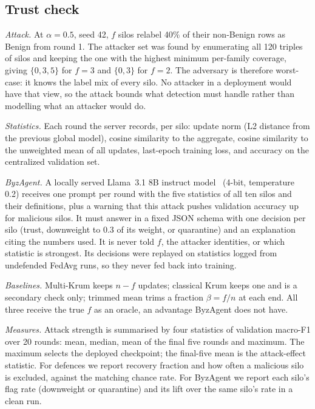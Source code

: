 \documentclass[conference]{IEEEtran}
\begin{document}
\subsection{Trust check}
\label{sec:m-trust}
\emph{Attack.} At $\alpha=0.5$, seed 42, $f$ silos relabel 40\% of their non-Benign rows %
as Benign from round 1. The attacker set was found by enumerating all 120 triples %
of silos and keeping the one with the highest minimum per-family coverage, giving
$\{0,3,5\}$ for $f=3$ and $\{0,3\}$ for $f=2$. The adversary is therefore worst-case: it %
knows the label mix of every silo. No attacker in a deployment would have that view, so
the attack bounds what detection must handle rather than modelling what an attacker
would do.

\emph{Statistics.} Each round the server records, per silo: update norm (L2 distance
from the previous global model), cosine similarity to the aggregate, cosine similarity
to the unweighted mean of all updates, last-epoch training loss, and accuracy on the
centralized validation set.

\emph{ByzAgent.} A locally served Llama~3.1 8B instruct model~\cite{grattafiori2024llama3}
(4-bit, temperature 0.2) receives one prompt per round with the five statistics of all %
ten silos and their definitions, plus a warning that this attack pushes validation
accuracy up for malicious silos. It must answer in a fixed JSON schema with one decision
per silo (trust, downweight to 0.3 of its weight, or quarantine) and an explanation %
citing the numbers used. It is never told $f$, the attacker identities, or which
statistic is strongest. Its decisions were replayed on statistics logged from undefended
FedAvg runs, so they never fed back into training.

\emph{Baselines.} Multi-Krum keeps $n-f$ updates; classical Krum keeps one and is a
secondary check only; trimmed mean trims a fraction $\beta=f/n$ at each end. All three
receive the true $f$ as an oracle, an advantage ByzAgent does not have.

\emph{Measures.} Attack strength is summarised by four statistics of validation
macro-F1 over 20 rounds: mean, median, mean of the final five rounds and maximum. The %
maximum selects the deployed checkpoint; the final-five mean is the attack-effect
statistic. For defences we report recovery fraction and how often a malicious silo is
excluded, against the matching chance rate. For ByzAgent we report each silo's flag rate
(downweight or quarantine) and its lift over the same silo's rate in a clean run.
\end{document}
